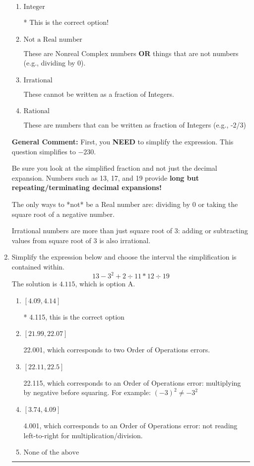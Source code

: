\documentclass{extbook}[14pt]
\newcommand{\litem}[1]{\item #1

\rule{\textwidth}{0.4pt}}
\begin{document}
\begin{enumerate}
{\begin{enumerate}[label=\Alph*.]
These are the counting numbers with 0 (0, 1, 2, 3, ...)
\item \( \text{Integer} \)

* This is the correct option!
\item \( \text{Not a Real number} \)

These are Nonreal Complex numbers \textbf{OR} things that are not numbers (e.g., dividing by 0).
\item \( \text{Irrational} \)

These cannot be written as a fraction of Integers.
\item \( \text{Rational} \)

These are numbers that can be written as fraction of Integers (e.g., -2/3)
\end{enumerate}

\textbf{General Comment:} First, you \textbf{NEED} to simplify the expression. This question simplifies to $-230$. 
 
 Be sure you look at the simplified fraction and not just the decimal expansion. Numbers such as 13, 17, and 19 provide \textbf{long but repeating/terminating decimal expansions!} 
 
 The only ways to *not* be a Real number are: dividing by 0 or taking the square root of a negative number. 
 
 Irrational numbers are more than just square root of 3: adding or subtracting values from square root of 3 is also irrational.
}
\litem{
Simplify the expression below and choose the interval the simplification is contained within.
\[ 13 - 3^2 + 2 \div 11 * 12 \div 19 \]The solution is \( 4.115 \), which is option A.\begin{enumerate}[label=\Alph*.]
\item \( [4.09, 4.14] \)

* 4.115, this is the correct option
\item \( [21.99, 22.07] \)

 22.001, which corresponds to two Order of Operations errors.
\item \( [22.11, 22.5] \)

 22.115, which corresponds to an Order of Operations error: multiplying by negative before squaring. For example: $(-3)^2 \neq -3^2$
\item \( [3.74, 4.09] \)

 4.001, which corresponds to an Order of Operations error: not reading left-to-right for multiplication/division.
\item \( \text{None of the above} \)


\end{enumerate}}
\end{enumerate}
\end{document}

